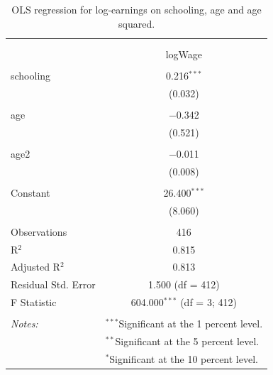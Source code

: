 \documentclass[
]{article}
\begin{document}
\begin{table}[!htbp] \centering 
  \caption{OLS regression for log-earnings on schooling, age and age squared.} 
  \label{tab:q1_a_ols} 
\small 
\begin{tabular}{@{\extracolsep{5pt}}lc} 
\\[-1.8ex]\hline 
\hline \\[-1.8ex] 
\\[-1.8ex] & logWage \\ 
\hline \\[-1.8ex] 
 schooling & 0.216$^{***}$ \\ 
  & (0.032) \\ 
  & \\ 
 age & $-$0.342 \\ 
  & (0.521) \\ 
  & \\ 
 age2 & $-$0.011 \\ 
  & (0.008) \\ 
  & \\ 
 Constant & 26.400$^{***}$ \\ 
  & (8.060) \\ 
  & \\ 
Observations & 416 \\ 
R$^{2}$ & 0.815 \\ 
Adjusted R$^{2}$ & 0.813 \\ 
Residual Std. Error & 1.500 (df = 412) \\ 
F Statistic & 604.000$^{***}$ (df = 3; 412) \\ 
\hline \\[-1.8ex] 
\textit{Notes:} & \multicolumn{1}{l}{$^{***}$Significant at the 1 percent level.} \\ 
 & \multicolumn{1}{l}{$^{**}$Significant at the 5 percent level.} \\ 
 & \multicolumn{1}{l}{$^{*}$Significant at the 10 percent level.} \\ 
\end{tabular} 
\end{table}
\end{document}
